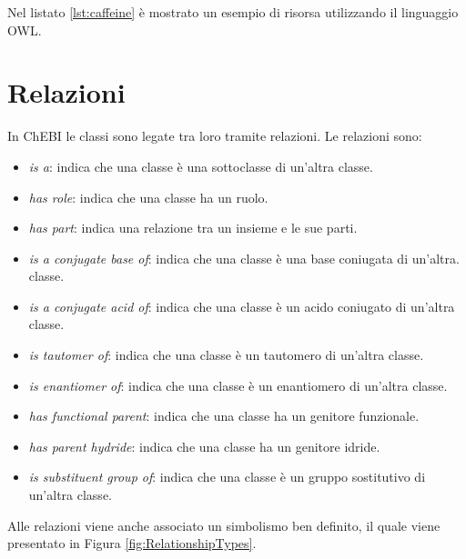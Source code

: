 \documentclass[12pt,a4paper,openright,twoside]{book}
\begin{document}
Nel listato \ref{lst:caffeine} è mostrato un esempio di risorsa utilizzando il linguaggio OWL.



\chapter{Relazioni}
\label{chap:relationships}

In ChEBI le classi sono legate tra loro tramite relazioni. Le relazioni sono:
\begin{itemize}
	\item \textit{is a}: indica che una classe è una sottoclasse di un'altra classe.
	\item \textit{has role}: indica che una classe ha un ruolo.
	\item \textit{has part}: indica una relazione tra un insieme e le sue parti.
	\item \textit{is a conjugate base of}: indica che una classe è una base coniugata di un'altra. classe.
	\item \textit{is a conjugate acid of}: indica che una classe è un acido coniugato di un'altra classe.
	\item \textit{is tautomer of}: indica che una classe è un tautomero di un'altra classe.
	\item \textit{is enantiomer of}: indica che una classe è un enantiomero di un'altra classe.
	\item \textit{has functional parent}: indica che una classe ha un genitore funzionale.
	\item \textit{has parent hydride}: indica che una classe ha un genitore idride.
	\item \textit{is substituent group of}: indica che una classe è un gruppo sostitutivo di un'altra classe.
\end{itemize}

Alle relazioni viene anche associato un simbolismo ben definito, il quale viene presentato in Figura \ref{fig:RelationshipTypes}.
\end{document}
